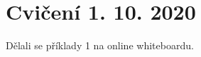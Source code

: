 \documentclass[12pt]{article}					%
\begin{document}
\section{Cvičení 1. 10. 2020}
    Dělali se příklady 1 na online whiteboardu.
\end{document}
